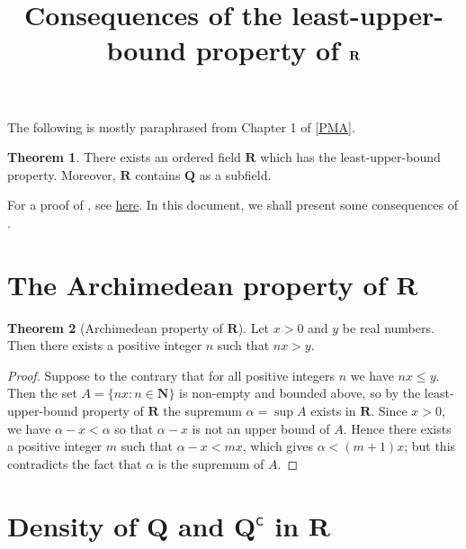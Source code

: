 \documentclass[12pt]{article}
\title{Consequences of the least-upper-bound property of \texorpdfstring{\( \R \)}{}}
\author{}
\date{\vspace{-24mm}}
\theoremstyle{definition}
\newtheorem{theorem}{Theorem}
\newcommand{\setcomp}[1]{#1^{\mathsf{c}}}
\newcommand{\N}{\mathbf{N}}
\newcommand{\Q}{\mathbf{Q}}
\newcommand{\R}{\mathbf{R}}
\begin{document}
\maketitle

\tableofcontents

\newpage

The following is mostly paraphrased from Chapter 1 of \hyperlink{pma}{[PMA]}.

\begin{theorem}
\label{thm:R_exists}
    There exists an ordered field \( \R \) which has the least-upper-bound property. Moreover, \( \R \) contains \( \Q \) as a subfield.
\end{theorem}

For a proof of , see \href{https://lew98.github.io/Mathematics/Construction_of_R_from_Q_via_Dedekind_cuts.pdf}{here}. In this document, we shall present some consequences of .

\section{The Archimedean property of \texorpdfstring{\( \R \)}{}}
\label{sec:archimedean_property_of_R}

\begin{theorem}[Archimedean property of \( \R \)]
\label{thm:archimedean_property_of_R}
    Let \( x > 0 \) and \( y \) be real numbers. Then there exists a positive integer \( n \) such that \( nx > y \).
\end{theorem}

\begin{proof}
    Suppose to the contrary that for all positive integers \( n \) we have \( nx \leq y \). Then the set \( A = \{ nx : n \in \N \} \) is non-empty and bounded above, so by the least-upper-bound property of \( \R \) the supremum \( \alpha = \sup A \) exists in \( \R \). Since \( x > 0 \), we have \( \alpha - x < \alpha \) so that \( \alpha - x \) is not an upper bound of \( A \). Hence there exists a positive integer \( m \) such that \( \alpha - x < mx \), which gives \( \alpha < (m+1)x \); but this contradicts the fact that \( \alpha \) is the supremum of \( A \).
\end{proof}

\section{Density of \texorpdfstring{\( \Q \)}{} and \texorpdfstring{\( \setcomp{\Q} \)}{} in \texorpdfstring{\( \R \)}{}}
\end{document}

